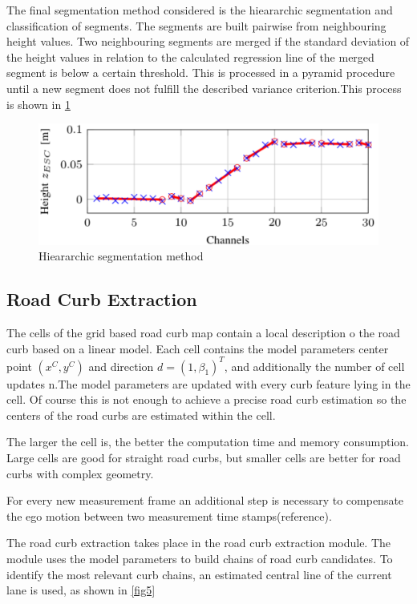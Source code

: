 The final segmentation method considered is the hieararchic segmentation and classification of segments. The segments are built pairwise from neighbouring height values. Two neighbouring segments are merged if the standard deviation of the height values in relation to the calculated regression line of the merged segment is below a certain threshold. This is processed in a pyramid procedure until a new segment does not fulfill the described variance criterion.This process is shown in \ref{fig4}

\begin{figure}[H]
	\centering
 	\includegraphics[scale = 0.55]{pictures/iepf3.pdf}
	\caption{Hieararchic segmentation method  \cite{lidar13}}
	\label{fig4}
\end{figure}

\subsection{Road Curb Extraction}

The cells of the grid based road curb map contain a local description o the road curb based on a linear model. Each cell contains the model parameters center point $(x^C, y^C)$ and direction $d = (1, \beta_1)^T$, and additionally the number of cell updates n.The model parameters are updated with every curb feature lying in the cell. Of course this is not enough to achieve a precise road curb estimation so the centers of the road curbs are estimated within the cell.

The larger the cell is, the better the computation time and memory consumption. Large cells are good for straight road curbs, but smaller cells are better for road curbs with complex geometry.

For every new measurement frame an additional step is necessary to compensate the ego motion between two measurement time stamps(reference). 

The road curb extraction takes place in the road curb extraction module. The module uses the model parameters to build chains of road curb candidates. To identify the most relevant curb chains, an estimated central line of the current lane is used, as shown in \ref{fig5}



